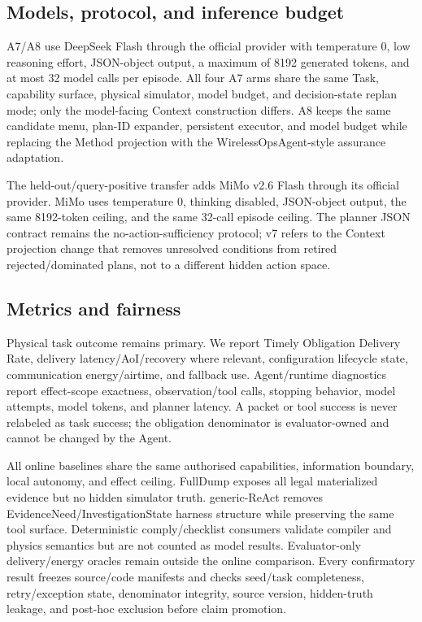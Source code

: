 \documentclass[journal,10pt]{IEEEtran}
\begin{document}
\subsection{Models, protocol, and inference budget}
A7/A8 use DeepSeek Flash through the official provider with temperature 0, low reasoning effort,
JSON-object output, a maximum of 8192 generated tokens, and at most 32 model calls per episode.
All four A7 arms share the same Task, capability surface, physical simulator, model budget, and
decision-state replan mode; only the model-facing Context construction differs. A8 keeps the same
candidate menu, plan-ID expander, persistent executor, and model budget while replacing the Method
projection with the WirelessOpsAgent-style assurance adaptation.

The held-out/query-positive transfer adds MiMo v2.6 Flash through its official provider. MiMo uses
temperature 0, thinking disabled, JSON-object output, the same 8192-token ceiling, and the same
32-call episode ceiling. The planner JSON contract remains the no-action-sufficiency protocol; v7
refers to the Context projection change that removes unresolved conditions from retired
rejected/dominated plans, not to a different hidden action space.

\subsection{Metrics and fairness}
Physical task outcome remains primary. We report Timely Obligation Delivery Rate, delivery
latency/AoI/recovery where relevant, configuration lifecycle state, communication energy/airtime,
and fallback use. Agent/runtime diagnostics report effect-scope exactness, observation/tool calls,
stopping behavior, model attempts, model tokens, and planner latency. A packet or tool success is
never relabeled as task success; the obligation denominator is evaluator-owned and cannot be
changed by the Agent.

All online baselines share the same authorised capabilities, information boundary, local autonomy,
and effect ceiling. FullDump exposes all legal materialized evidence but no hidden simulator truth.
generic-ReAct removes EvidenceNeed/InvestigationState harness structure while preserving the same
tool surface. Deterministic comply/checklist consumers validate compiler and physics semantics but
are not counted as model results. Evaluator-only delivery/energy oracles remain outside the online
comparison. Every confirmatory result freezes source/code manifests and checks seed/task
completeness, retry/exception state, denominator integrity, source version, hidden-truth leakage,
and post-hoc exclusion before claim promotion.
\end{document}
